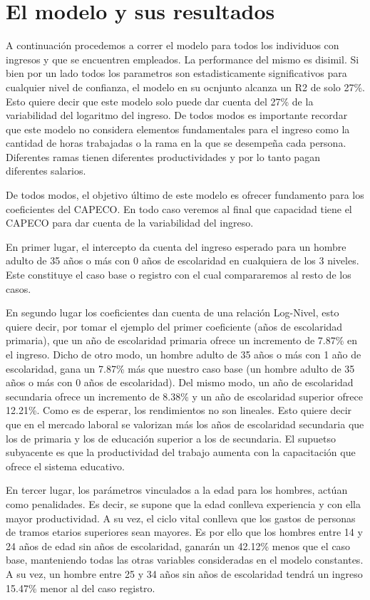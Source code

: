 \section{El modelo y sus resultados}
A continuación procedemos a correr el modelo para todos los individuos con ingresos y que se encuentren empleados. La performance del mismo es disimil. Si bien por un lado todos los parametros son estadisticamente significativos para cualquier nivel de confianza, el modelo en su ocnjunto alcanza un R2 de solo 27\%. Esto quiere decir que este modelo solo puede dar cuenta del 27\% de la variabilidad del logaritmo del ingreso. De todos modos es importante recordar que este modelo no considera elementos fundamentales para el ingreso como la cantidad de horas trabajadas o la rama en la que se desempeña cada persona. Diferentes ramas tienen diferentes productividades y por lo tanto pagan diferentes salarios.

De todos modos, el objetivo último de este modelo es ofrecer fundamento para los coeficientes del CAPECO. En todo caso veremos al final que capacidad tiene el CAPECO para dar cuenta de la variabilidad del ingreso.

En primer lugar, el intercepto da cuenta del ingreso esperado para un hombre adulto de 35 años o más con 0 años de escolaridad en cualquiera de los 3 niveles. Este constituye el caso base o registro con el cual compararemos al resto de los casos.

En segundo lugar los coeficientes dan cuenta de una relación Log-Nivel, esto quiere decir, por tomar el ejemplo del primer coeficiente (años de escolaridad primaria), que un año de escolaridad primaria ofrece un incremento de 7.87\% en el ingreso. Dicho de otro modo, un hombre adulto de 35 años o más con 1 año de escolaridad, gana un 7.87\% más que nuestro caso base (un hombre adulto de 35 años o más con 0 años de escolaridad). Del mismo modo, un año de escolaridad secundaria ofrece un incremento de 8.38\% y un año de escolaridad superior ofrece 12.21\%. Como es de esperar, los rendimientos no son lineales. Esto quiere decir que en el mercado laboral se valorizan más los años de escolaridad secundaria que los de primaria y los de educación superior a los de secundaria. El supuetso subyacente es que la productividad del trabajo aumenta con la capacitación que ofrece el sistema educativo.

En tercer lugar, los parámetros vinculados a la edad para los hombres, actúan como penalidades. Es decir, se supone que la edad conlleva experiencia y con ella mayor productividad. A su vez, el ciclo vital conlleva que los gastos de personas de tramos etarios superiores sean mayores. Es por ello que los hombres entre 14 y 24 años de edad sin años de escolaridad, ganarán un 42.12\% menos que el caso base, manteniendo todas las otras variables consideradas en el modelo constantes. A su vez, un hombre entre 25 y 34 años sin años de escolaridad tendrá un ingreso 15.47\% menor al del caso registro.

